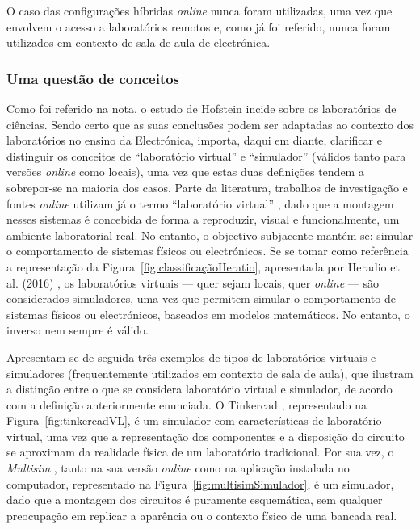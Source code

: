 O caso das configurações híbridas \textit{online} nunca foram utilizadas, uma vez que envolvem o acesso a laboratórios remotos e, como já foi referido, nunca foram utilizados  em contexto de sala de aula de electrónica.

\subsubsection{Uma questão de conceitos}
\label{sec:questaodeconceitos}
Como foi referido na nota, o estudo de Hofstein incide sobre os laboratórios de ciências. Sendo certo que as suas conclusões podem ser adaptadas ao contexto dos laboratórios no ensino da Electrónica, importa, daqui em diante, clarificar e distinguir os conceitos de ``laboratório virtual'' e ``simulador'' (válidos tanto para versões \textit{online} como locais), uma vez que estas duas definições tendem a sobrepor-se na maioria dos casos. Parte da literatura, trabalhos de investigação e fontes \textit{online} utilizam já o termo ``laboratório virtual'' \cite{BRINSON2015218, virtuallabng, EMaster2024May}, dado que a montagem nesses sistemas é concebida de forma a reproduzir, visual e funcionalmente, um ambiente laboratorial real. No entanto, o objectivo subjacente mantém-se: simular o comportamento de sistemas físicos ou electrónicos. Se se tomar como referência a representação da Figura~\ref{fig:classificaçãoHeratio}, apresentada por Heradio et al. (2016) \cite{HERADIO20161}, os laboratórios virtuais — quer sejam locais, quer \textit{online} — são considerados simuladores, uma vez que permitem simular o comportamento de sistemas físicos ou electrónicos, baseados em modelos matemáticos. No entanto, o inverso nem sempre é válido.

Apresentam-se de seguida três exemplos de tipos de laboratórios virtuais e simuladores (frequentemente utilizados em contexto de sala de aula), que ilustram a distinção entre o que se considera laboratório virtual e simulador, de acordo com a definição anteriormente enunciada. O Tinkercad \cite{tinkercad}, representado na Figura~\ref{fig:tinkercadVL}, é um simulador com características de laboratório virtual, uma vez que a representação dos componentes e a disposição do circuito se aproximam da realidade física de um laboratório tradicional. Por sua vez, o \textit{Multisim} \cite{multisim}, tanto na sua versão \textit{online} como na aplicação instalada no computador, representado na Figura~\ref{fig:multisimSimulador}, é um simulador, dado que a montagem dos circuitos é puramente esquemática, sem qualquer preocupação em replicar a aparência ou o contexto físico de uma bancada real.

